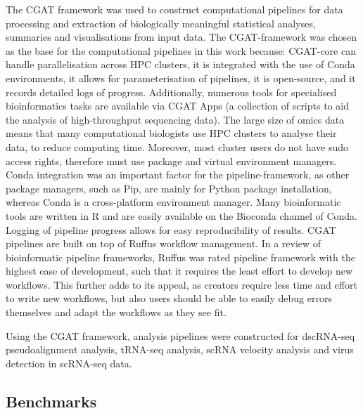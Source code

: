 The CGAT framework was used to construct computational pipelines for data processing and extraction of biologically meaningful statistical analyses, summaries and visualisations from input data.
The CGAT-framework was chosen as the base for the computational pipelines in this work because: CGAT-core can handle parallelisation across HPC clusters, it is integrated with the use of Conda environments, it allows for parameterisation of pipelines, it is open-source, and it records detailed logs of progress.
Additionally, numerous tools for specialised bioinformatics tasks are available via CGAT Apps\cite{sims2014cgat} (a collection of scripts to aid the analysis of high-throughput sequencing data).
The large size of omics data means that many computational biologists use HPC clusters to analyse their data, to reduce computing time.
Moreover, most cluster users do not have sudo access rights, therefore must use package and virtual environment managers.
Conda integration was an important factor for the pipeline-framework, as other package managers, such as Pip, are mainly for Python package installation, whereas Conda is a cross-platform environment manager.
Many bioinformatic tools are written in R and are easily available on the Bioconda channel of Conda.
Logging of pipeline progress allows for easy reproducibility of results.
CGAT pipelines are built on top of Ruffus workflow management.
In a review of bioinformatic pipeline frameworks, Ruffus was rated pipeline framework with the highest ease of development, such that it requires the least effort to develop new workflows\cite{leipzig2017review}.
This further adds to its appeal, as creators require less time and effort to write new workflows, but also users should be able to easily debug errors themselves and adapt the workflows as they see fit.

Using the CGAT framework, analysis pipelines were constructed for dscRNA-seq pseudoalignment analysis, tRNA-seq analysis, scRNA velocity analysis and virus detection in scRNA-seq data.

\subsection{Benchmarks}

